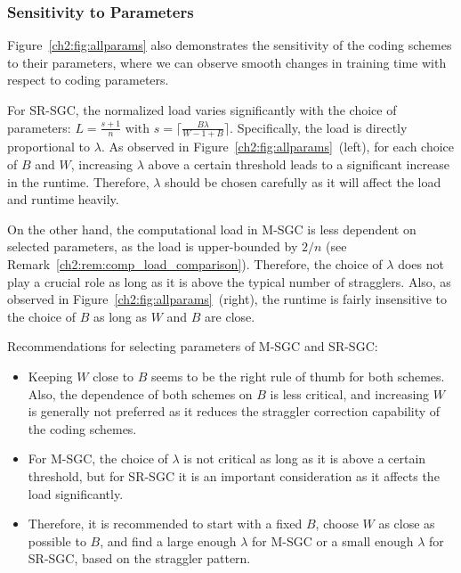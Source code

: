 \subsubsection{Sensitivity to Parameters}

Figure~\ref{ch2:fig:allparams} also demonstrates the sensitivity of the coding schemes to their parameters, where we can observe smooth changes in training time with respect to coding parameters. 

For SR-SGC, the normalized load varies significantly with the choice of parameters: $L=\frac{s+1}{n}$ with $s = \lceil\frac{B\lambda}{W-1+B}\rceil$. Specifically, the load is directly proportional to $\lambda$. As observed in Figure~\ref{ch2:fig:allparams}~(left), for each choice of $B$ and $W$, increasing $\lambda$ above a certain threshold leads to a significant increase in the runtime. Therefore, $\lambda$ should be chosen carefully as it will affect the load and runtime heavily.

On the other hand, the computational load in M-SGC is less dependent on selected parameters, as the load is upper-bounded by $2/n$ (see Remark~\ref{ch2:rem:comp_load_comparison}). Therefore, the choice of $\lambda$ does not play a crucial role as long as it is above the typical number of stragglers. Also, as observed in Figure~\ref{ch2:fig:allparams}~(right), the runtime is fairly insensitive to the choice of $B$ as long as $W$ and $B$ are close. 

\begin{remark}\normalfont\label{ch2:rem:param_selection}
Recommendations for selecting parameters of M-SGC and SR-SGC: 

\begin{itemize}
    \item Keeping $W$ close to $B$ seems to be the right rule of thumb for both schemes. Also, the dependence of both schemes on $B$ is less critical, and increasing $W$ is generally not preferred as it reduces the straggler correction capability of the coding schemes.

    \item For M-SGC, the choice of $\lambda$ is not critical as long as it is above a certain threshold, but for SR-SGC it is an important consideration as it affects the load significantly.

    \item Therefore, it is recommended to start with a fixed $B$, choose $W$ as close as possible to $B$, and find a large enough $\lambda$ for M-SGC or a small enough $\lambda$ for SR-SGC, based on the straggler pattern.   
\end{itemize}
\end{remark}

